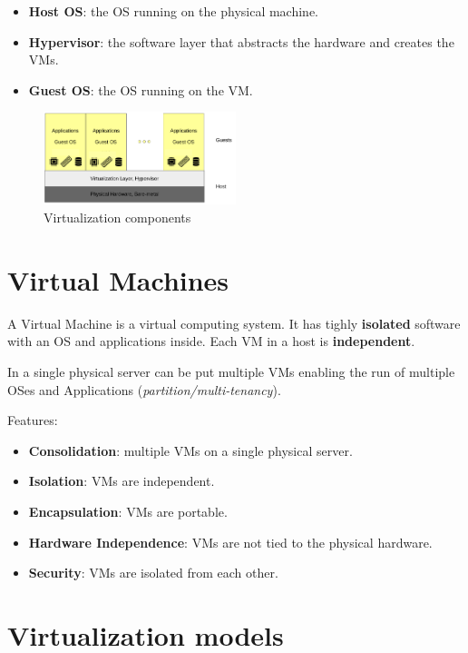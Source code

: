 \begin{itemize}
    \item \textbf{Host OS}: the OS running on the physical machine.
    \item \textbf{Hypervisor}: the software layer that abstracts the hardware and creates the VMs.
    \item \textbf{Guest OS}: the OS running on the VM.
\end{itemize}

\begin{figure}[H]
    \centering
    \includegraphics[width=0.5\textwidth]{assets/fig28.png}
    \caption{Virtualization components}
\end{figure}

\section{Virtual Machines}

A Virtual Machine is a virtual computing system. It has tighly \textbf{isolated} software with an OS and applications inside. Each VM in a host is \textbf{independent}. 

In a single physical server can be put multiple VMs enabling the run of multiple OSes and Applications (\textit{partition/multi-tenancy}).

Features:
\begin{itemize}
    \item \textbf{Consolidation}: multiple VMs on a single physical server.
    \item \textbf{Isolation}: VMs are independent.
    \item \textbf{Encapsulation}: VMs are portable.
    \item \textbf{Hardware Independence}: VMs are not tied to the physical hardware.
    \item \textbf{Security}: VMs are isolated from each other.
\end{itemize}

\section{Virtualization models}

